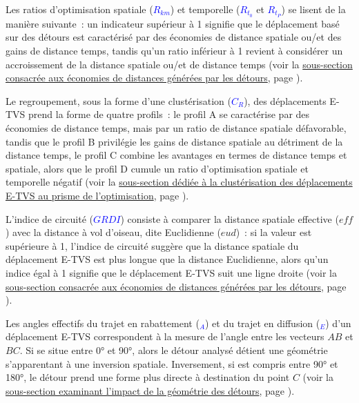 Les ratios d'optimisation spatiale (\textcolor{blue}{$R_{km}$}) et temporelle (\textcolor{blue}{$R_{t_0}$} et \textcolor{blue}{$R_{t_P}$}) se lisent de la manière suivante~: un indicateur supérieur à 1 signifie que le déplacement basé sur des détours est caractérisé par des économies de distance spatiale ou/et des gains de distance temps, tandis qu'un ratio inférieur à 1 revient à considérer un accroissement de la distance spatiale ou/et de distance temps (voir la \hyperref[Les détours, catalyseurs d'économie de distance]{sous-section consacrée aux économies de distances générées par les détours}, page \pageref{Les détours, catalyseurs d'économie de distance}).\par

Le regroupement, sous la forme d'une clustérisation (\textcolor{blue}{$C_{R}$}), des déplacements \acrshort{E-TVS} prend la forme de quatre profils~: le profil A se caractérise par des économies de distance temps, mais par un ratio de distance spatiale défavorable, tandis que le profil B privilégie les gains de distance spatiale au détriment de la distance temps, le profil C combine les avantages en termes de distance temps et spatiale, alors que le profil D cumule un ratio d'optimisation spatiale et temporelle négatif (voir la \hyperref[Clustérisation des déplacements intermodaux E-TVS du point de vue de l'optimisation spatio-temporelle]{sous-section dédiée à la clustérisation des déplacements E-TVS au prisme de l'optimisation}, page \pageref{Clustérisation des déplacements intermodaux E-TVS du point de vue de l'optimisation spatio-temporelle}).\par

L'indice de circuité (\textcolor{blue}{$ GRDI $}) consiste à comparer la distance spatiale effective ($eff$) avec la distance à vol d'oiseau, dite Euclidienne ($eud$)~: si la valeur est supérieure à 1, l'indice de circuité suggère que la distance spatiale du déplacement \acrshort{E-TVS} est plus longue que la distance Euclidienne, alors qu'un indice égal à 1 signifie que le déplacement \acrshort{E-TVS} suit une ligne droite (voir la \hyperref[Les détours, catalyseurs d'économie de distance]{sous-section consacrée aux économies de distances générées par les détours}, page \pageref{Les détours, catalyseurs d'économie de distance}).\par

Les angles effectifs du trajet en \gls{rabattement} (\textcolor{blue}{\alpha$_A$}) et du trajet en \gls{diffusion} (\textcolor{blue}{\alpha$_E$}) d'un déplacement \acrshort{E-TVS} correspondent à la mesure de l'angle entre les vecteurs $AB$ et $BC$. Si \alpha se situe entre 0° et 90°, alors le détour analysé détient une géométrie s'apparentant à une inversion spatiale. Inversement, si \alpha est compris entre 90° et 180°, le détour prend une forme plus directe à destination du point $C$ (voir la \hyperref[L'inversion spatiale, moteur de l'optimisation espace-temps]{sous-section examinant l'impact de la géométrie des détours}, page \pageref{L'inversion spatiale, moteur de l'optimisation espace-temps}).\par
    
